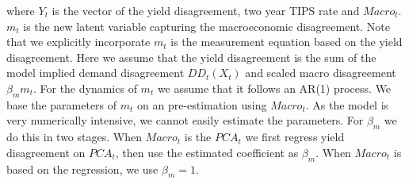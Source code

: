 where $Y_t$ is the vector of the yield disagreement, two year TIPS rate and $Macro_t$. $m_t$ is the new latent variable capturing the macroeconomic disagreement. Note that we explicitly incorporate $m_t$ is the measurement equation based on the yield disagreement. Here we assume that the yield disagreement is the sum of the model implied demand disagreement $DD_t\left(X_t\right)$ and scaled macro disagreement $\beta_m m_t$. For the dynamics of $m_t$ we assume that it follows an AR(1) process. We base the parameters of $m_t$ on an pre-estimation using $Macro_t$. 
As the model is very numerically intensive, we cannot easily estimate the parameters. For $\beta_m$ we do this in two stages. When $Macro_t$ is the $PCA_t$ we first regress yield disagreement on $PCA_t$, then use the estimated coefficient as $\beta_m$. When $Macro_t$ is based on the regression, we use $\beta_m = 1$. 

